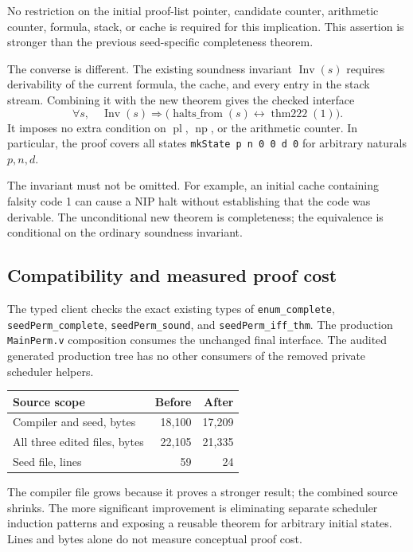 \documentclass[11pt]{article}
\newcommand{\np}{\operatorname{np}}
\newcommand{\pl}{\operatorname{pl}}
\newcommand{\Inv}{\operatorname{Inv}}
\newcommand{\code}[1]{\texttt{#1}}
\begin{document}
No restriction on the initial proof-list pointer, candidate counter, arithmetic counter, formula, stack, or cache is required for this implication. This assertion is stronger than the previous seed-specific completeness theorem.

The converse is different. The existing soundness invariant $\Inv(s)$ requires derivability of the current formula, the cache, and every entry in the stack stream. Combining it with the new theorem gives the checked interface
\[
 \forall s,\quad\Inv(s)\Longrightarrow
 \bigl(\operatorname{halts\_from}(s)\leftrightarrow\operatorname{thm222}(1)\bigr).
\]
It imposes no extra condition on $\pl$, $\np$, or the arithmetic counter. In particular, the proof covers all states \code{mkState p n 0 0 d 0} for arbitrary naturals $p,n,d$.

The invariant must not be omitted. For example, an initial cache containing falsity code 1 can cause a NIP halt without establishing that the code was derivable. The unconditional new theorem is completeness; the equivalence is conditional on the ordinary soundness invariant.

\subsection{Compatibility and measured proof cost}

The typed client checks the exact existing types of \code{enum\_complete}, \code{seedPerm\_complete}, \code{seedPerm\_sound}, and \code{seedPerm\_iff\_thm}. The production \code{MainPerm.v} composition consumes the unchanged final interface. The audited generated production tree has no other consumers of the removed private scheduler helpers.

\begin{center}
\begin{tabular}{@{}lrr@{}}
\toprule
Source scope & Before & After\\
\midrule
Compiler and seed, bytes & 18,100 & 17,209\\
All three edited files, bytes & 22,105 & 21,335\\
Seed file, lines & 59 & 24\\
\bottomrule
\end{tabular}
\end{center}

The compiler file grows because it proves a stronger result; the combined source shrinks. The more significant improvement is eliminating separate scheduler induction patterns and exposing a reusable theorem for arbitrary initial states. Lines and bytes alone do not measure conceptual proof cost.
\end{document}
